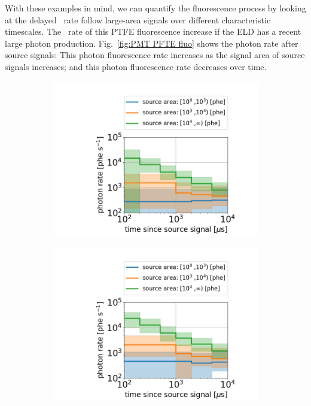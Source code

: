 With these examples in mind, we can quantify the fluorescence process by looking at the delayed \sphe\ rate follow large-area signals over different characteristic timescales. The \sphe\ rate of this PTFE fluorescence increase if the ELD has a recent large photon production. Fig.~\ref{fig:PMT PFTE fluo} shows the photon rate after source signals: This photon fluorescence rate increases as the signal area of source signals increases; and this photon fluorescence rate decreases over time. 

\begin{figure}[!p]
	\centering
	\begin{subfigure}[t]{\twofigurewidth}
		\centering
		\includegraphics[width=\textwidth,clip,trim={0 0 0 0},angle=0,origin=c]{Figures/GasTest/DatasetQuality/topPMTPTFEFluoEva64767.jpg}
		\caption{}
		\label{fig:PMT PFTE fluo top}
	\end{subfigure}
	\begin{subfigure}[t]{\twofigurewidth}
		\centering
		\includegraphics[width=\textwidth,clip,trim={0 0 0 0}]{Figures/GasTest/DatasetQuality/botPMTPTFEFluoEva64767.jpg}

\end{subfigure}
\end{figure}
